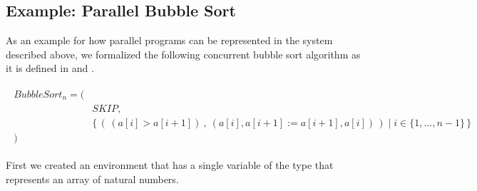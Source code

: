 \subsection{Example: Parallel Bubble Sort}
\label{subsec:parallel-bubble-sort}

As an example for how parallel programs can be represented in the system described above, we formalized the following concurrent bubble sort algorithm as it is defined in \cite{hz-orsi} and \cite{hz-article}.




\vspace{-0.5cm} %

\begin{align}
\begin{split}
    BubbleSort_n = ( & \\
      & SKIP, \\
      & \{ \, ( \, (a[i] > a[i+1]) \: , \: (a[i], a[i+1] := a[i+1], a[i]) \, ) \; | \; i \in \{1,\dots,n-1\} \, \} \\
    ) &
\end{split}
\end{align}

First we created an environment that has a single variable of the type that represents an array of natural numbers.

